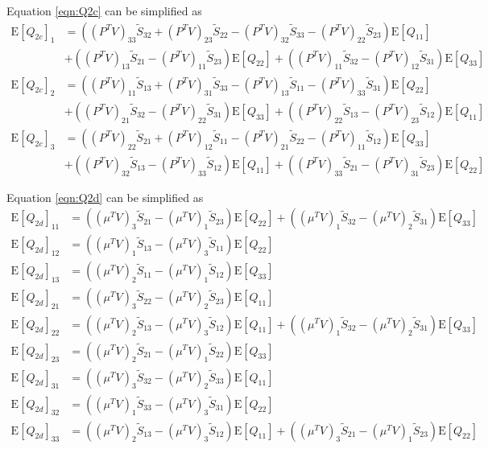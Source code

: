 \documentclass[10pt]{article}
\newcommand{\expect}[1]{\ensuremath{\mathrm{E}\left[ #1 \right]}}
\begin{document}
Equation \eqref{eqn:Q2c} can be simplified as
\begin{align}
	\expect{Q_{2c}}_1 &= \left( (P^TV)_{33}\tilde{S}_{32} + (P^TV)_{23}\tilde{S}_{22} - (P^TV)_{32}\tilde{S}_{33} - (P^TV)_{22}\tilde{S}_{23} \right)\expect{Q_{11}} \nonumber \\
	&+ \left( (P^TV)_{13}\tilde{S}_{21} - (P^TV)_{11}\tilde{S}_{23} \right)\expect{Q_{22}} + \left( (P^TV)_{11}\tilde{S}_{32} - (P^TV)_{12}\tilde{S}_{31} \right)\expect{Q_{33}} \nonumber \\
	\expect{Q_{2c}}_2 &= \left( (P^TV)_{11}\tilde{S}_{13} + (P^TV)_{31}\tilde{S}_{33} - (P^TV)_{13}\tilde{S}_{11} - (P^TV)_{33}\tilde{S}_{31} \right)\expect{Q_{22}} \nonumber \\
	&+ \left( (P^TV)_{21}\tilde{S}_{32} - (P^TV)_{22}\tilde{S}_{31} \right)\expect{Q_{33}} + \left( (P^TV)_{22}\tilde{S}_{13} - (P^TV)_{23}\tilde{S}_{12} \right)\expect{Q_{11}} \nonumber \\
	\expect{Q_{2c}}_3 &= \left( (P^TV)_{22}\tilde{S}_{21} + (P^TV)_{12}\tilde{S}_{11} - (P^TV)_{21}\tilde{S}_{22} - (P^TV)_{11}\tilde{S}_{12} \right)\expect{Q_{33}} \nonumber \\
	&+ \left( (P^TV)_{32}\tilde{S}_{13} - (P^TV)_{33}\tilde{S}_{12} \right)\expect{Q_{11}} + \left( (P^TV)_{33}\tilde{S}_{21} - (P^TV)_{31}\tilde{S}_{23} \right)\expect{Q_{22}}
\end{align}

Equation \eqref{eqn:Q2d} can be simplified as
\begin{align}
	\expect{Q_{2d}}_{11} &= \left( (\mu^TV)_3\tilde{S}_{21} - (\mu^TV)_1\tilde{S}_{23} \right)\expect{Q_{22}} + \left( (\mu^TV)_1\tilde{S}_{32} - (\mu^TV)_2\tilde{S}_{31} \right)\expect{Q_{33}} \nonumber \\
	\expect{Q_{2d}}_{12} &= \left( (\mu^TV)_1\tilde{S}_{13} - (\mu^TV)_3\tilde{S}_{11} \right)\expect{Q_{22}} \nonumber \\
	\expect{Q_{2d}}_{13} &= \left( (\mu^TV)_2\tilde{S}_{11} - (\mu^TV)_1\tilde{S}_{12} \right)\expect{Q_{33}} \nonumber \\
	\expect{Q_{2d}}_{21} &= \left( (\mu^TV)_3\tilde{S}_{22} - (\mu^TV)_2\tilde{S}_{23} \right)\expect{Q_{11}} \nonumber \\
	\expect{Q_{2d}}_{22} &= \left( (\mu^TV)_2\tilde{S}_{13} - (\mu^TV)_3\tilde{S}_{12} \right)\expect{Q_{11}} + \left( (\mu^TV)_1\tilde{S}_{32} - (\mu^TV)_2\tilde{S}_{31} \right)\expect{Q_{33}} \nonumber \\
	\expect{Q_{2d}}_{23} &= \left( (\mu^TV)_2\tilde{S}_{21} - (\mu^TV)_1\tilde{S}_{22} \right)\expect{Q_{33}} \nonumber \\
	\expect{Q_{2d}}_{31} &= \left( (\mu^TV)_3\tilde{S}_{32} - (\mu^TV)_2\tilde{S}_{33} \right)\expect{Q_{11}} \nonumber \\
	\expect{Q_{2d}}_{32} &= \left( (\mu^TV)_1\tilde{S}_{33} - (\mu^TV)_3\tilde{S}_{31} \right)\expect{Q_{22}} \nonumber \\
	\expect{Q_{2d}}_{33} &= \left( (\mu^TV)_2\tilde{S}_{13} - (\mu^TV)_3\tilde{S}_{12} \right)\expect{Q_{11}} + \left( (\mu^TV)_3\tilde{S}_{21} - (\mu^TV)_1\tilde{S}_{23} \right)\expect{Q_{22}}
\end{align}
\end{document}

